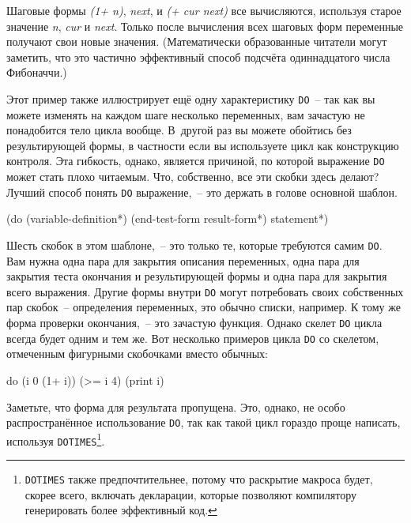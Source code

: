Шаговые формы \textit{(1+ n)}, \textit{next}, и \textit{(+ cur next)} все вычисляются,
используя старое значение \textit{n}, \textit{cur} и \textit{next}. Только после
вычисления всех шаговых форм переменные получают свои новые значения. (Математически
образованные читатели могут заметить, что это частично эффективный способ подсчёта
одиннадцатого числа Фибоначчи.)

Этот пример также иллюстрирует ещё одну характеристику \lstinline{DO}~-- так как вы можете
изменять на каждом шаге несколько переменных, вам зачастую не понадобится тело цикла
вообще. В~другой раз вы можете обойтись без результирующей формы, в частности если вы
используете цикл как конструкцию контроля. Эта гибкость, однако, является причиной, по
которой выражение \lstinline{DO} может стать плохо читаемым. Что, собственно, все эти скобки
здесь делают? Лучший способ понять \lstinline{DO} выражение,~-- это держать в голове основной
шаблон.

\begin{myverb}
(do (variable-definition*)
    (end-test-form result-form*)
  statement*)
\end{myverb}

Шесть скобок в этом шаблоне,~-- это только те, которые требуются самим \lstinline{DO}. Вам нужна
одна пара для закрытия описания переменных, одна пара для закрытия теста окончания и
результирующей формы и одна пара для закрытия всего выражения. Другие формы внутри
\lstinline{DO} могут потребовать своих собственных пар скобок~-- определения переменных, это
обычно списки, например. К тому же форма проверки окончания,~-- это зачастую функция. Однако
скелет \lstinline{DO} цикла всегда будет одним и тем же. Вот несколько примеров цикла \lstinline{DO}
со скелетом, отмеченным фигурными скобочками вместо обычных:

\begin{myverb}
{do {(i 0 (1+ i))}
    {(>= i 4)}
  (print i)}
\end{myverb}

Заметьте, что форма для результата пропущена. Это, однако, не особо распространённое
использование \lstinline{DO}, так как такой цикл гораздо проще написать, используя
\lstinline{DOTIMES}\footnote{\lstinline{DOTIMES} также предпочтительнее, потому что раскрытие
  макроса будет, скорее всего, включать декларации, которые позволяют компилятору
  генерировать более эффективный код.}\hspace{\footnotenegspace}.

